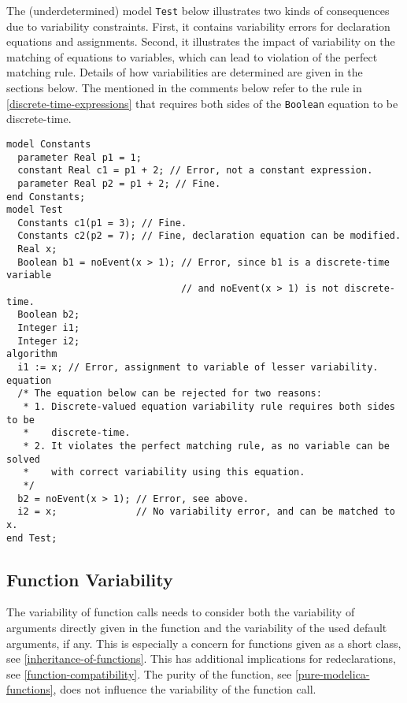 \begin{example}
The (underdetermined) model \lstinline!Test! below illustrates two kinds of consequences due to variability constraints.
First, it contains variability errors for declaration equations and assignments.
Second, it illustrates the impact of variability on the matching of equations to variables, which can lead to violation of the perfect matching rule.
Details of how variabilities are determined are given in the sections below.
The  mentioned in the comments below refer to the rule in \cref{discrete-time-expressions} that requires both sides of the \lstinline!Boolean! equation to be discrete-time.
\begin{lstlisting}[language=modelica]
model Constants
  parameter Real p1 = 1;
  constant Real c1 = p1 + 2; // Error, not a constant expression.
  parameter Real p2 = p1 + 2; // Fine.
end Constants;
model Test
  Constants c1(p1 = 3); // Fine.
  Constants c2(p2 = 7); // Fine, declaration equation can be modified.
  Real x;
  Boolean b1 = noEvent(x > 1); // Error, since b1 is a discrete-time variable
                               // and noEvent(x > 1) is not discrete-time.
  Boolean b2;
  Integer i1;
  Integer i2;
algorithm
  i1 := x; // Error, assignment to variable of lesser variability.
equation
  /* The equation below can be rejected for two reasons:
   * 1. Discrete-valued equation variability rule requires both sides to be
   *    discrete-time.
   * 2. It violates the perfect matching rule, as no variable can be solved
   *    with correct variability using this equation.
   */
  b2 = noEvent(x > 1); // Error, see above.
  i2 = x;              // No variability error, and can be matched to x.
end Test;
\end{lstlisting}
\end{example}

\subsection{Function Variability}\label{function-variability}

The variability of function calls needs to consider both the variability of arguments directly given in the function and the variability of the used default arguments, if any.
This is especially a concern for functions given as a short class, see \cref{inheritance-of-functions}.
This has additional implications for redeclarations, see \cref{function-compatibility}.
The purity of the function, see \cref{pure-modelica-functions}, does not influence the variability of the function call.

